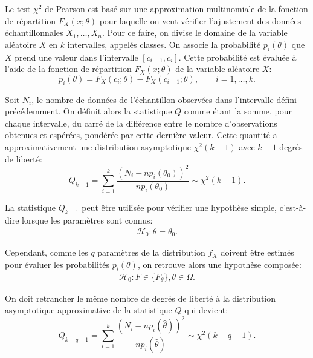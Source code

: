 Le test $\chi^2$ de Pearson \citep[ch. 8]{hogg1978introduction} est
basé sur une approximation multinomiale de la fonction de répartition
$F_X(x;\theta)$ pour laquelle on veut vérifier l'ajustement des
données échantillonnales $X_1,\ldots,X_n$. Pour ce faire, on divise le
domaine de la variable aléatoire $X$ en $k$ intervalles, appelés
classes. On associe la probabilité $p_i(\theta)$ que $X$ prend une
valeur dans l'intervalle $\left[c_{i-1},c_{i}\right]$. Cette
probabilité est évaluée à l'aide de la fonction de répartition
$F_X(x;\theta)$ de la variable aléatoire $X$:
\begin{equation}
  \label{eq:pmultinomiale}
  p_i(\theta) = F_X(c_{i};\theta) - F_X(c_{i-1};\theta),\qquad i = 1,\ldots,k.
\end{equation}

Soit $N_i$, le nombre de données de l'échantillon observées dans
l'intervalle défini précédemment. On définit alors la statistique $Q$
comme étant la somme, pour chaque intervalle, du carré de la
différence entre le nombre d'observations obtenues et espérées,
pondérée par cette dernière valeur. Cette quantité a approximativement
une distribution asymptotique $\chi^2(k-1)$ avec $k-1$ degrés de
liberté:
\begin{equation}
  \label{eq:statchi2}
  Q_{k-1} = \sum_{i=1}^{k} \frac{\left(N_i-np_i(\theta_0)\right)^2}{np_i(\theta_0)} \sim \chi^2(k-1).
\end{equation}

La statistique $Q_{k-1}$ peut être utilisée pour vérifier une
hypothèse simple, c'est-à-dire lorsque les paramètres sont connus:
\begin{align}
  \label{eq:hyp0-1}
  \mathcal{H}_0: \theta = \theta_0.
\end{align}

Cependant, comme les $q$ paramètres de la distribution $f_X$ doivent
être estimés pour évaluer les probabilités $p_i(\theta)$, on retrouve
alors une hypothèse composée:
\begin{align}
  \label{eq:hyp0-2}
  \mathcal{H}_0: F \in \lbrace F_{\theta} \rbrace, \theta \in \Omega.
\end{align}

On doit retrancher le même nombre de degrés de liberté à la
distribution asymptotique approximative de la statistique $Q$ qui
devient:
\begin{equation}
  \label{eq:statchi2param}
  Q_{k-q-1} = \sum_{i=1}^{k} \frac{\left(N_i-n{p}_i(\hat\theta)\right)^2}{n{p}_i(\hat\theta)} \sim \chi^2(k-q-1).
\end{equation}

